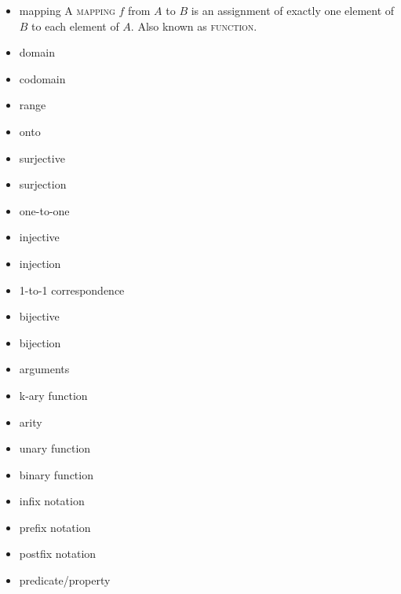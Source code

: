 \documentclass{article}
\newcommand{\term}[1]{\textsc{#1}}
\begin{document}
\begin{itemize}
\item mapping
  \subitem A \term{mapping} $f$ from $A$ to $B$ is an assignment of exactly one element of $B$ to each element of $A$. Also known as \term{function}.

\item domain

\item codomain

\item range

\item onto

\item surjective

\item surjection

\item one-to-one

\item injective

\item injection

\end{itemize}

\bigskip \indent
\begin{itemize}
\item 1-to-1 correspondence

\item bijective

\item bijection

\item arguments

\item k-ary function

\item arity

\item unary function

\item binary function

\item infix notation

\item prefix notation

\item postfix notation

\item predicate/property

\end{itemize}
\end{document}
